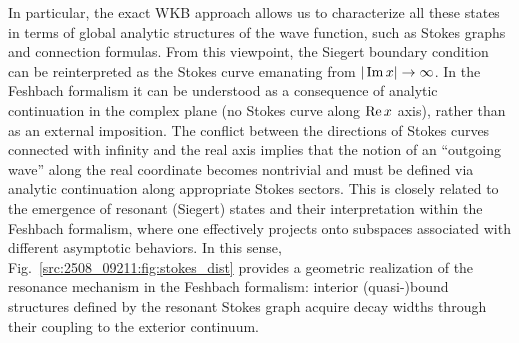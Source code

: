 In particular, the exact WKB approach allows us to characterize all these states in terms of global analytic structures of the wave function, such as Stokes graphs and connection formulas. From this viewpoint, the Siegert boundary condition can be reinterpreted as the Stokes curve emanating from $|\operatorname{Im} x|\to\infty$. In the Feshbach formalism it can be understood as a consequence of analytic continuation in the complex plane (no Stokes curve along $\operatorname{Re} x$ axis), rather than as an external imposition.
The conflict between the directions of Stokes curves connected with infinity and the real axis implies that the notion of an ``outgoing wave'' along the real coordinate becomes nontrivial and must be defined via analytic continuation along appropriate Stokes sectors. This is closely related to the emergence of resonant (Siegert) states and their interpretation within the Feshbach formalism, where one effectively projects onto subspaces associated with different asymptotic behaviors.
In this sense, Fig.~\ref{src:2508_09211:fig:stokes_dist} provides a geometric realization of the resonance mechanism in the Feshbach formalism: interior (quasi-)bound structures defined by the resonant Stokes graph acquire decay widths through their coupling to the exterior continuum.
